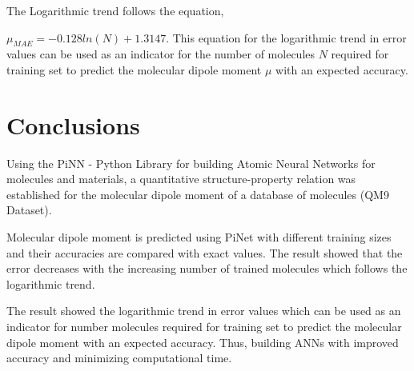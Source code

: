 \documentclass[11pt,a4paper]{report}
\begin{document}
{ The Logarithmic trend follows the equation,

 $\mu_{MAE}=-0.128 ln(N)+1.3147$. This equation for the logarithmic trend in error values can be used as an indicator for the number of molecules $N$ required for training set to predict the molecular dipole moment  $\mu$ with an expected accuracy.


\chapter{Conclusions}
Using the PiNN - Python Library for building Atomic Neural Networks for molecules and materials, a quantitative structure-property relation was established for the molecular dipole moment of a database of molecules (QM9 Dataset).

Molecular dipole moment is predicted using PiNet with different training sizes and their accuracies are compared with exact values. The result showed that the error decreases with the increasing number of trained molecules which follows the logarithmic trend. 

The result showed the logarithmic trend in error values which can be used as an indicator for number molecules required for training set to predict the molecular dipole moment with an expected accuracy. Thus, building ANNs with improved accuracy and minimizing computational time.

}
\end{document}
